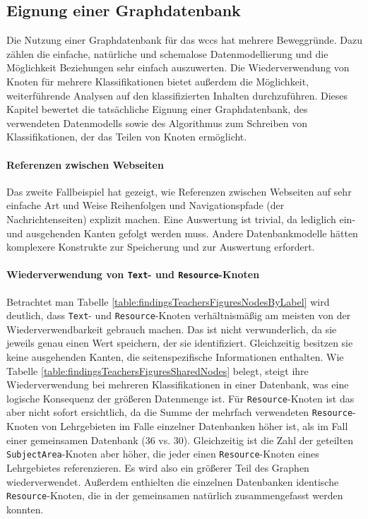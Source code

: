 \subsection{Eignung einer Graphdatenbank}
    Die Nutzung einer Graphdatenbank für das \gls{wccs} hat mehrere Beweggründe.
    Dazu zählen die einfache, natürliche und schemalose Datenmodellierung
    und die Möglichkeit Beziehungen sehr einfach auszuwerten.
    Die Wiederverwendung von Knoten für mehrere Klassifikationen
    bietet außerdem die Möglichkeit, weiterführende Analysen auf den
    klassifizierten Inhalten durchzuführen.
    Dieses Kapitel bewertet die tatsächliche Eignung einer Graphdatenbank,
    des verwendeten Datenmodells sowie des Algorithmus
    zum Schreiben von Klassifikationen, der das Teilen von Knoten ermöglicht.

    \paragraph{Referenzen zwischen Webseiten}
    Das zweite Fallbeispiel hat gezeigt,
    wie Referenzen zwischen Webseiten auf sehr einfache Art und Weise
    Reihenfolgen und Navigationspfade (der Nachrichtenseiten) explizit machen.
    Eine Auswertung ist trivial, da lediglich ein- und ausgehenden Kanten gefolgt werden muss.
    Andere Datenbankmodelle hätten komplexere Konstrukte
    zur Speicherung und zur Auswertung erfordert.

    \paragraph{Wiederverwendung von \texttt{Text}- und \texttt{Resource}-Knoten}
    Betrachtet man Tabelle \ref{table:findingsTeachersFiguresNodesByLabel} wird deutlich,
    dass \texttt{Text}- und \texttt{Resource}-Knoten verhältnismäßig am meisten von der
    Wiederverwendbarkeit gebrauch machen.
    Das ist nicht verwunderlich, da sie jeweils genau einen Wert speichern,
    der sie identifiziert.
    Gleichzeitig besitzen sie keine ausgehenden Kanten,
    die seitenspezifische Informationen enthalten.
    Wie Tabelle \ref{table:findingsTeachersFiguresSharedNodes} belegt,
    steigt ihre Wiederverwendung bei mehreren Klassifikationen in einer Datenbank,
    was eine logische Konsequenz der größeren Datenmenge ist.
    Für \texttt{Resource}-Knoten ist das aber nicht sofort ersichtlich, da
    die Summe der mehrfach verwendeten \texttt{Resource}-Knoten von Lehrgebieten
    im Falle einzelner Datenbanken höher ist, als im Fall einer gemeinsamen Datenbank (36 vs. 30).
    Gleichzeitig ist die Zahl der geteilten \texttt{SubjectArea}-Knoten aber höher,
    die jeder einen \texttt{Resource}-Knoten eines Lehrgebietes referenzieren.
    Es wird also ein größerer Teil des Graphen wiederverwendet.
    Außerdem enthielten die einzelnen Datenbanken identische \texttt{Resource}-Knoten,
    die in der gemeinsamen natürlich zusammengefasst werden konnten.

